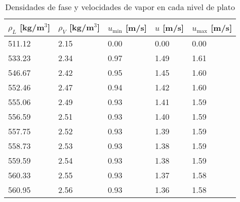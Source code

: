 \newpage
\begin{table}[ht]
    \centering\small
    \caption{Densidades de fase y velocidades de vapor en cada nivel de plato}
    \begin{tabular}{|p{2.5cm}|p{2.5cm}|p{2.5cm}|p{2.5cm}|p{2.5cm}|}
        \hline
        \textbf{$\rho_L$ [kg/m$^3$]} & \textbf{$\rho_V$ [kg/m$^3$]} & \textbf{$u_{\text{min}}$ [m/s]} & \textbf{$u$ [m/s]} & \textbf{$u_{\text{max}}$ [m/s]} \\ \hline
        511.12                       & 2.15                         & 0.00                            & 0.00               & 0.00                            \\ \hline
        533.23                       & 2.34                         & 0.97                            & 1.49               & 1.61                            \\ \hline
        546.67                       & 2.42                         & 0.95                            & 1.45               & 1.60                            \\ \hline
        552.46                       & 2.47                         & 0.94                            & 1.42               & 1.60                            \\ \hline
        555.06                       & 2.49                         & 0.93                            & 1.41               & 1.59                            \\ \hline
        556.59                       & 2.51                         & 0.93                            & 1.40               & 1.59                            \\ \hline
        557.75                       & 2.52                         & 0.93                            & 1.39               & 1.59                            \\ \hline
        558.73                       & 2.53                         & 0.93                            & 1.38               & 1.59                            \\ \hline
        559.59                       & 2.54                         & 0.93                            & 1.38               & 1.59                            \\ \hline
        560.33                       & 2.55                         & 0.93                            & 1.37               & 1.58                            \\ \hline
        560.95                       & 2.56                         & 0.93                            & 1.36               & 1.58                            \\ \hline

\end{tabular}
\end{table}

